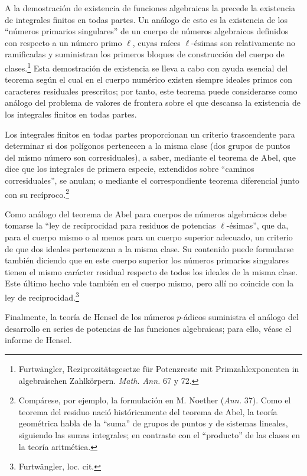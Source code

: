 \documentclass[11pt]{article}
\begin{document}
A la demostración de existencia de funciones algebraicas la precede la existencia de integrales finitos en todas partes. Un análogo de esto es la existencia de los ``números primarios singulares'' de un cuerpo de números algebraicos definidos con respecto a un número primo \(\ell\), cuyas raíces \(\ell\)-ésimas son relativamente no ramificadas y suministran los primeros bloques de construcción del cuerpo de clases.\footnote{Furtwängler, Reziprozitätsgesetze für Potenzreste mit Primzahlexponenten in algebraischen Zahlkörpern. \emph{Math. Ann.} 67 y 72.} Esta demostración de existencia se lleva a cabo con ayuda esencial del teorema según el cual en el cuerpo numérico existen siempre ideales primos con caracteres residuales prescritos; por tanto, este teorema puede considerarse como análogo del problema de valores de frontera sobre el que descansa la existencia de los integrales finitos en todas partes.

Los integrales finitos en todas partes proporcionan un criterio trascendente para determinar si dos polígonos pertenecen a la misma clase (dos grupos de puntos del mismo número son corresiduales), a saber, mediante el teorema de Abel, que dice que los integrales de primera especie, extendidos sobre ``caminos corresiduales'', se anulan; o mediante el correspondiente teorema diferencial junto con su recíproco.\footnote{Compárese, por ejemplo, la formulación en M. Noether (\emph{Ann.} 37). Como el teorema del residuo nació históricamente del teorema de Abel, la teoría geométrica habla de la ``suma'' de grupos de puntos y de sistemas lineales, siguiendo las sumas integrales; en contraste con el ``producto'' de las clases en la teoría aritmética.}

Como análogo del teorema de Abel para cuerpos de números algebraicos debe tomarse la ``ley de reciprocidad para residuos de potencias \(\ell\)-ésimas'', que da, para el cuerpo mismo o al menos para un cuerpo superior adecuado, un criterio de que dos ideales pertenezcan a la misma clase. Su contenido puede formularse también diciendo que en este cuerpo superior los números primarios singulares tienen el mismo carácter residual respecto de todos los ideales de la misma clase. Este último hecho vale también en el cuerpo mismo, pero allí no coincide con la ley de reciprocidad.\footnote{Furtwängler, loc. cit.}

Finalmente, la teoría de Hensel de los números \(p\)-ádicos suministra el análogo del desarrollo en series de potencias de las funciones algebraicas; para ello, véase el informe de Hensel.
\end{document}
